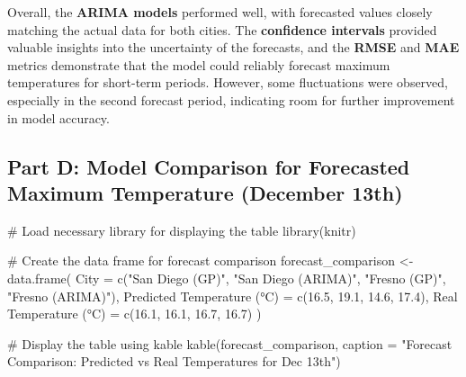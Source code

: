\documentclass[
  11pt,
]{article}
\newenvironment{Shaded}{\begin{snugshade}}{\end{snugshade}}
\newcommand{\AttributeTok}[1]{\textcolor[rgb]{0.40,0.45,0.13}{#1}}
\newcommand{\CommentTok}[1]{\textcolor[rgb]{0.37,0.37,0.37}{#1}}
\newcommand{\FloatTok}[1]{\textcolor[rgb]{0.68,0.00,0.00}{#1}}
\newcommand{\FunctionTok}[1]{\textcolor[rgb]{0.28,0.35,0.67}{#1}}
\newcommand{\NormalTok}[1]{\textcolor[rgb]{0.00,0.23,0.31}{#1}}
\newcommand{\OtherTok}[1]{\textcolor[rgb]{0.00,0.23,0.31}{#1}}
\newcommand{\StringTok}[1]{\textcolor[rgb]{0.13,0.47,0.30}{#1}}
\begin{document}
Overall, the \textbf{ARIMA models} performed well, with forecasted
values closely matching the actual data for both cities. The
\textbf{confidence intervals} provided valuable insights into the
uncertainty of the forecasts, and the \textbf{RMSE} and \textbf{MAE}
metrics demonstrate that the model could reliably forecast maximum
temperatures for short-term periods. However, some fluctuations were
observed, especially in the second forecast period, indicating room for
further improvement in model accuracy.

\subsection{Part D: Model Comparison for Forecasted Maximum Temperature
(December
13th)}\label{part-d-model-comparison-for-forecasted-maximum-temperature-december-13th}

\begin{Shaded}
\begin{Highlighting}[]
\CommentTok{\# Load necessary library for displaying the table}
\FunctionTok{library}\NormalTok{(knitr)}

\CommentTok{\# Create the data frame for forecast comparison}
\NormalTok{forecast\_comparison }\OtherTok{\textless{}{-}} \FunctionTok{data.frame}\NormalTok{(}
  \AttributeTok{City =} \FunctionTok{c}\NormalTok{(}\StringTok{"San Diego (GP)"}\NormalTok{, }\StringTok{"San Diego (ARIMA)"}\NormalTok{, }\StringTok{"Fresno (GP)"}\NormalTok{, }\StringTok{"Fresno (ARIMA)"}\NormalTok{),}
  \StringTok{\textasciigrave{}}\AttributeTok{Predicted Temperature (°C)}\StringTok{\textasciigrave{}} \OtherTok{=} \FunctionTok{c}\NormalTok{(}\FloatTok{16.5}\NormalTok{, }\FloatTok{19.1}\NormalTok{, }\FloatTok{14.6}\NormalTok{, }\FloatTok{17.4}\NormalTok{),}
  \StringTok{\textasciigrave{}}\AttributeTok{Real Temperature (°C)}\StringTok{\textasciigrave{}} \OtherTok{=} \FunctionTok{c}\NormalTok{(}\FloatTok{16.1}\NormalTok{, }\FloatTok{16.1}\NormalTok{, }\FloatTok{16.7}\NormalTok{, }\FloatTok{16.7}\NormalTok{)}
\NormalTok{)}

\CommentTok{\# Display the table using kable}
\FunctionTok{kable}\NormalTok{(forecast\_comparison, }\AttributeTok{caption =} \StringTok{"Forecast Comparison: Predicted vs Real Temperatures for Dec 13th"}\NormalTok{)}
\end{Highlighting}
\end{Shaded}
\end{document}
